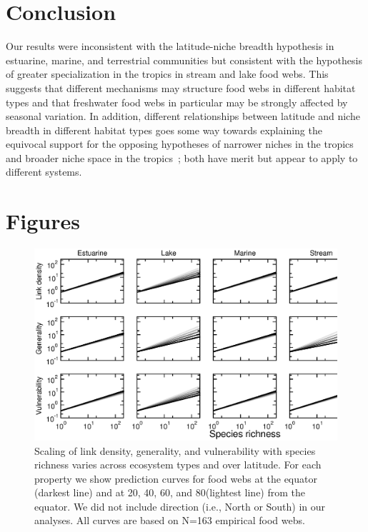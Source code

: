 \documentclass[12pt]{article}
\begin{document}
\begin{spacing}{1.0}
\section*{Conclusion}

  Our results were inconsistent with the latitude-niche breadth hypothesis in estuarine, marine,
  and terrestrial communities but consistent with the hypothesis of greater specialization
  in the tropics in stream and lake food webs. This suggests that different mechanisms may structure
  food webs in different habitat types and that freshwater food webs in particular may be strongly
  affected by seasonal variation. In addition, different relationships between latitude and niche
  breadth in different habitat types goes some way towards explaining the equivocal support for
  the opposing hypotheses of narrower niches in the tropics~\citep{Vazquez2004} and broader 
  niche space in the tropics~\citep{Davies2007}; both have merit but appear
  to apply to different systems.



\newpage

\newpage

\section*{Figures}

\begin{figure}[h]
\includegraphics[width=.85\textwidth]{Figures/by_TL/scaling_with_S/proportions/S_latlines_nonts.eps}
\caption{Scaling of link density, generality, and vulnerability with species richness
varies across ecosystem types and over latitude. For each property we show 
prediction curves for food webs at the equator (darkest line) and at 
20\degree, 40\degree, 60\degree, and 80\degree (lightest line) from the 
equator. We did not include direction (i.e., North or South) in our analyses. 
All curves are based on N=163 empirical food webs.}
\label{S}
\end{figure}



\end{spacing}
\end{document}

